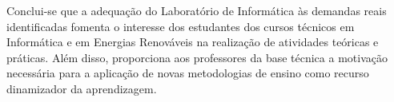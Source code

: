 \documentclass[12pt, openright, oneside, a4paper, brazil]{abntex2}
\begin{document}
	Conclui-se que a adequação do Laboratório de Informática às demandas reais identificadas fomenta o interesse dos estudantes dos cursos técnicos em Informática e em Energias Renováveis na realização de atividades teóricas e práticas. Além disso, proporciona aos professores da base técnica a motivação necessária para a aplicação de novas metodologias de ensino como recurso dinamizador da aprendizagem.
\postextual

\nocite{lobler2012renote,silva2015,nobre2015,gripa2002,galery2012,proinfo2009}

\makeatletter
\renewenvironment{thebibliography}[1]{%
  \begingroup
    \let\centering\raggedright   %
    \chapter*{\bibname}%
  \endgroup
  \addcontentsline{toc}{chapter}{\bibname}%
  \sloppy
  \list{\@biblabel{\@arabic\c@enumiv}}{%
    \settowidth\labelwidth{\@biblabel{#1}}%
    \leftmargin\labelwidth
    \advance\leftmargin\labelsep
    \@openbib@code
    \usecounter{enumiv}%
    \let\p@enumiv\@empty
    \renewcommand\theenumiv{\@arabic\c@enumiv}%
  }%
  \clubpenalty4000
  \@clubpenalty\clubpenalty
  \widowpenalty4000%
  \sfcode`\.\@m
}{%
  \def\@noitemerr{\@latex@warning{Empty `thebibliography' environment}}%
  \endlist
}
\makeatother


\end{document}
